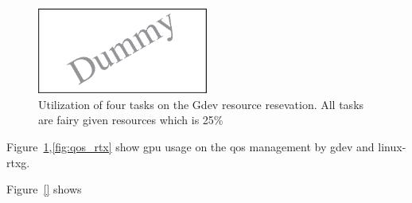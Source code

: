 \begin{figure}[t]
\begin{center}
\includegraphics[width=0.5\textwidth]{img/dummy}
\caption{Utilization of four tasks on the Gdev resource resevation. All tasks are fairy given resources which is 25\%}
\end{center}
\label{fig:qos_gdev}
\end{figure}


Figure~\ref{fig:qos_gdev},\ref{fig:qos_rtx} show gpu usage on the qos management by gdev and linux-rtxg.



Figure~\ref{} shows 
